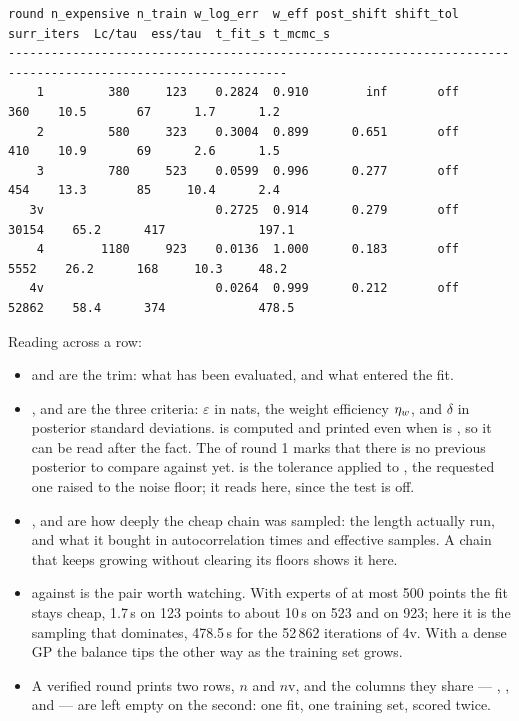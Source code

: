 \begin{lstlisting}[style=plain, basicstyle={\ttfamily\fontsize{7.6}{9.2}\selectfont}]
round n_expensive n_train w_log_err  w_eff post_shift shift_tol surr_iters  Lc/tau  ess/tau  t_fit_s t_mcmc_s
-------------------------------------------------------------------------------------------------------------
    1         380     123    0.2824  0.910        inf       off        360    10.5       67      1.7      1.2
    2         580     323    0.3004  0.899      0.651       off        410    10.9       69      2.6      1.5
    3         780     523    0.0599  0.996      0.277       off        454    13.3       85     10.4      2.4
   3v                        0.2725  0.914      0.279       off      30154    65.2      417             197.1
    4        1180     923    0.0136  1.000      0.183       off       5552    26.2      168     10.3     48.2
   4v                        0.0264  0.999      0.212       off      52862    58.4      374             478.5
\end{lstlisting}

Reading across a row:

\begin{itemize}
  \item {} and  are the trim: what has been evaluated, and what
        entered the fit.
  \item {},  and  are the three criteria:
        $\varepsilon$ in nats, the weight efficiency $\eta_w$, and $\delta$ in posterior standard
        deviations.  is computed and printed even when
         is , so it can be read after the fact.
        The  of round 1 marks that there is no previous posterior to compare against yet.
         is the tolerance applied to , the requested one raised to
        the noise floor; it reads  here, since the test is off.
  \item {},  and  are how deeply the cheap chain was
        sampled: the length actually run, and what it bought in autocorrelation times and effective
        samples. A chain that keeps growing without clearing its floors shows it here.
  \item {} against  is the pair worth watching. With experts of at
        most 500 points the fit stays cheap, 1.7\,s on 123 points to about 10\,s on 523 and on 923; here it
        is the sampling that dominates, 478.5\,s for the 52\,862 iterations of 4v. With a dense GP the
        balance tips the other way as the training set grows.
  \item A verified round prints two rows, $n$ and $n$v, and the columns they share ---
        , ,  and  --- are left empty
        on the second: one fit, one training set, scored twice.
\end{itemize}

